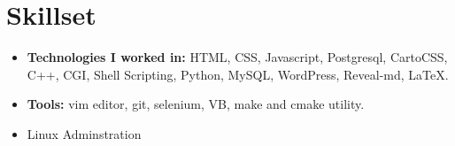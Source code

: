 \documentclass[11pt,a4paper,sans]{moderncv}        %
\begin{document}
\section{Skillset}

\vspace{6pt}
 
\begin{itemize}



\item \textbf{Technologies I worked in:} HTML, CSS, Javascript, Postgresql, CartoCSS, C++, CGI, Shell Scripting, Python, MySQL, WordPress, Reveal-md, LaTeX.

\item \textbf{Tools:} vim editor, git, selenium, VB, make and cmake utility.

\item Linux Adminstration
\end{itemize}



\nocite{*}



\end{document}
